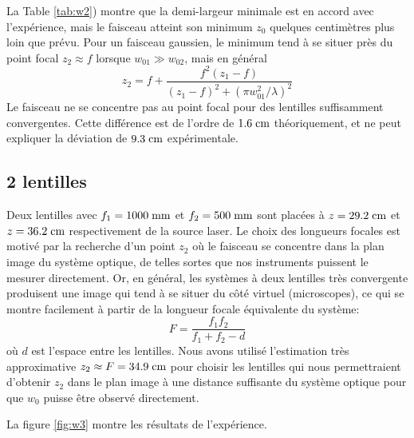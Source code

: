 \documentclass[10pt,letterpaper,twocolumn]{article}
\newcommand{\s}{\hspace{0.1cm}}
\begin{document}
La Table \ref{tab:w2}) montre que la demi-largeur minimale est en accord avec l'expérience, mais le faisceau atteint son minimum $z_0$ quelques centimètres plus loin que prévu.
Pour un faisceau gaussien, le minimum tend à se situer près du point focal $z_2 \approx f$ lorsque $w_{01} \gg w_{02}$, mais en général\supercite{Pedrotti}
\begin{equation}
	z_2 = f + \frac{f^2(z_1 - f)}{(z_1 - f)^2 + (\pi w_{01}^2 / \lambda)^2}
\end{equation}
Le faisceau ne se concentre pas au point focal pour des lentilles suffisamment convergentes. Cette différence est de l'ordre de $1.6\s \text{cm}$ théoriquement, et ne peut expliquer la déviation de $9.3\s \text{cm}$ expérimentale. 

\subsection{2 lentilles}
Deux lentilles avec $f_1=1000\s \text{mm}$ et $f_2 = 500\s \text{mm}$ sont placées à $z=29.2\s \text{cm}$ et $z = 36.2\s \text{cm}$ respectivement de la source laser. Le choix des longueurs focales est motivé par la recherche d'un point $z_2$ où le faisceau se concentre dans la plan image du système optique, de telles sortes que nos instruments puissent le mesurer directement. Or, en général, les systèmes à deux lentilles très convergente produisent une image qui tend à se situer du côté virtuel (microscopes), ce qui se montre facilement à partir de la longueur focale équivalente du système:
\begin{equation}
	F = \frac{f_1f_2}{f_1 + f_2 - d}
\end{equation}
où $d$ est l'espace entre les lentilles. Nous avons utilisé l'estimation très approximative $z_2 \approx F = 34.9\s \text{cm}$ pour choisir les lentilles qui nous permettraient d'obtenir $z_2$ dans le plan image à une distance suffisante du système optique pour que $w_0$ puisse être observé directement. \par
La figure \ref{fig:w3} montre les résultats de l'expérience.
\end{document}
